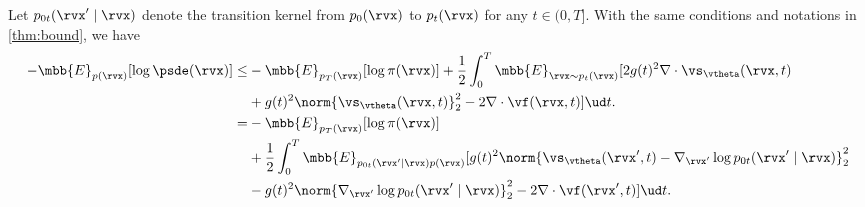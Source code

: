 \begin{theorem}\label{thm:elbo_bound}
Let $p_{0t}(\rvx' \mid \rvx)$ denote the transition kernel from $p_0(\rvx)$ to $p_t(\rvx)$ for any $t \in (0,T]$. With the same conditions and notations in \cref{thm:bound}, we have
\begin{align}
-\mbb{E}_{p(\rvx)}[\log \psde(\rvx)] 
\leq & -\mbb{E}_{p_T(\rvx)}[\log \pi(\rvx)] 
+ \frac{1}{2}\int_{0}^T \mbb{E}_{\rvx \sim p_t(\rvx)}[2g(t)^2 \nabla \cdot \vs_\vtheta(\rvx, t) \notag \\
&+ g(t)^2 \norm{\vs_\vtheta(\rvx, t)}_2^2 -2 \nabla \cdot \vf(\rvx, t)] \ud t. \label{eqn:elbo1}\\
=&  -\mbb{E}_{p_T(\rvx)}[\log \pi(\rvx)]  \notag \\
&+ \frac{1}{2}\int_{0}^T \mbb{E}_{p_{0t}(\rvx' \mid \rvx)p(\rvx)}[g(t)^2 \norm{\vs_\vtheta(\rvx', t) - \nabla_{\rvx'} \log p_{0t}(\rvx' \mid \rvx)}_2^2 \notag\\
&- g(t)^2\norm{\nabla_{\rvx'} \log p_{0t}(\rvx' \mid \rvx)}_2^2 -2 \nabla \cdot \vf(\rvx', t)] \ud t.\label{eqn:elbo2}
\end{align}
\end{theorem}
